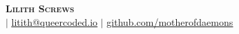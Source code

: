 \begin{center}
    \textbf{\Huge \scshape Lilith Screws} \\ \vspace{1pt}
    \small \PhoneNumber{} $|$ \href{mailto:lilith@queercoded.io}{\underline{litith@queercoded.io}} $|$ 
    \href{https://github.com/motherofdaemons}{\underline{github.com/motherofdaemons}}
\end{center}

